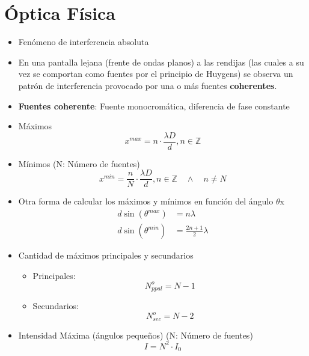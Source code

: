 \section{Óptica Física}
\begin{itemize}
    \item Fenómeno de interferencia absoluta
    \item En una pantalla lejana (frente de ondas planos) a las rendijas (las cuales a su vez se comportan como fuentes por el principio de Huygens) se observa un patrón de interferencia provocado por una o más fuentes \textbf{coherentes}.
    \item \textbf{Fuentes coherente}: Fuente monocromática, diferencia de fase constante
    \item Máximos
    \begin{equation}
        x^{max} = n \cdot \frac{\lambda D}{d} , n \in \mathbb Z
    \end{equation}
    \item Mínimos (N: Número de fuentes)
    \begin{equation}
        x^{min} = \frac{n}{N} \cdot \frac{\lambda D}{d} , n \in \mathbb Z \quad \land \quad n \neq N
    \end{equation}
    \item Otra forma de calcular los máximos y mínimos en función del ángulo $\theta$x
    \begin{equation}
    \begin{split}
       d \sin(\theta^{max}) &= n \lambda \\
       d \sin(\theta^{min}) &= \frac{2n + 1}{2} \lambda 
    \end{split}
    \end{equation}
    \item Cantidad de máximos principales y secundarios
    \begin{itemize}
        \item Principales:
        \begin{equation}
            N^o_{ppal} = N - 1
        \end{equation}
        \item Secundarios:
        \begin{equation}
            N^o_{sec} = N - 2
        \end{equation}
    \end{itemize}
    \item Intensidad Máxima (ángulos pequeños) (N: Número de fuentes)
    \begin{equation}
        I = N^2 \cdot I_0
    \end{equation}
\end{itemize}


